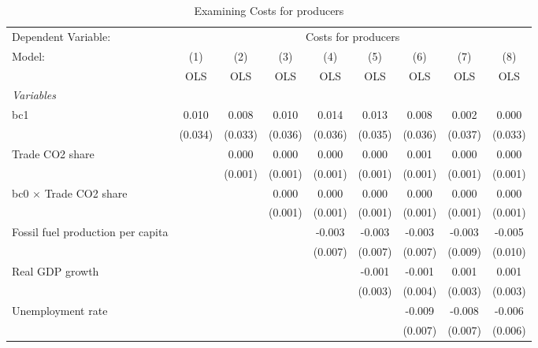 
\begin{table}[htbp]
   \caption{Examining Costs for producers}
   \centering
   \begin{tabular}{lcccccccc}
      \toprule
      Dependent Variable: & \multicolumn{8}{c}{Costs for producers}\\
      Model:                                  & (1)     & (2)     & (3)     & (4)     & (5)     & (6)     & (7)     & (8)\\  
                                              &  OLS    & OLS     & OLS     & OLS     & OLS     & OLS     & OLS     & OLS\\  
      \midrule
      \emph{Variables}\\
      bc1                                     & 0.010   & 0.008   & 0.010   & 0.014   & 0.013   & 0.008   & 0.002   & 0.000\\   
                                              & (0.034) & (0.033) & (0.036) & (0.036) & (0.035) & (0.036) & (0.037) & (0.033)\\   
      Trade CO2 share                         &         & 0.000   & 0.000   & 0.000   & 0.000   & 0.001   & 0.000   & 0.000\\   
                                              &         & (0.001) & (0.001) & (0.001) & (0.001) & (0.001) & (0.001) & (0.001)\\   
      bc0 $\times$ Trade CO2 share            &         &         & 0.000   & 0.000   & 0.000   & 0.000   & 0.000   & 0.000\\   
                                              &         &         & (0.001) & (0.001) & (0.001) & (0.001) & (0.001) & (0.001)\\   
      Fossil fuel production per capita       &         &         &         & -0.003  & -0.003  & -0.003  & -0.003  & -0.005\\   
                                              &         &         &         & (0.007) & (0.007) & (0.007) & (0.009) & (0.010)\\   
      Real GDP growth                         &         &         &         &         & -0.001  & -0.001  & 0.001   & 0.001\\   
                                              &         &         &         &         & (0.003) & (0.004) & (0.003) & (0.003)\\   
      Unemployment rate                       &         &         &         &         &         & -0.009  & -0.008  & -0.006\\   
                                              &         &         &         &         &         & (0.007) & (0.007) & (0.006)\\   

\end{tabular}
\end{table}
